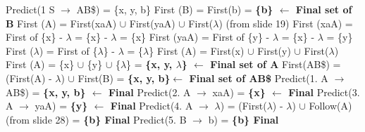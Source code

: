 \documentclass{report}
\begin{document}
\begin{multicols}{2}
\setlength{\leftskip}{-12em}
\hspace{-.5cm}Predict(1 S $\rightarrow$ AB\$) = \{x, y, b\}\newline
\indent\hspace{.25cm}First (B) = First(b) = \textbf{ \{b\} $\leftarrow$ Final set of B}\newline
\indent\hspace{.25cm}First (A) = First(xaA) $\cup$  First(yaA) $\cup$  First($\lambda$) (from slide 19)\newline
\indent\hspace{1cm}First (xaA) = First of \{x\} - $\lambda$ = \{x\} - $\lambda$ = \{x\}\newline
\indent\hspace{1cm}First (yaA) = First of \{y\} - $\lambda$ = \{x\} - $\lambda$ = \{y\}\newline
\indent\hspace{1cm}First ($\lambda$) = First of \{$\lambda$\} - $\lambda$ = \{$\lambda$\}\newline
\indent\hspace{1cm}First (A) = First(x) $\cup$  First(y) $\cup$  First($\lambda$)\newline
\indent\hspace{1cm}First (A) = \{x\} $\cup$ \{y\} $\cup$  \{$\lambda$\} = \textbf{ \{x, y, $\lambda$\} $\leftarrow$ Final set of A}\newline
\indent\hspace{.25cm}First(AB\$) = (First(A) - $\lambda$) $\cup$ First(B) = \textbf{ \{x, y, b\}$\leftarrow$ Final set of AB\$} \newline
Predict(1. A $\rightarrow$ AB\$) = \textbf{\{x, y, b\} $\leftarrow$ Final}\newline
Predict(2. A $\rightarrow$ xaA) = \textbf{\{x\} $\leftarrow$ Final}\newline
Predict(3. A $\rightarrow$ yaA) = \textbf{\{y\} $\leftarrow$ Final}\newline
Predict(4. A $\rightarrow$ $\lambda$) = (First($\lambda$) - $\lambda$) $\cup$ Follow(A)				(from slide 28)\newline
\indent\hspace{2.3cm}= \textbf{\{b\} Final}\newline
Predict(5. B $\rightarrow$ b) = \textbf{\{b\} Final}
\end{multicols}
\end{document}
